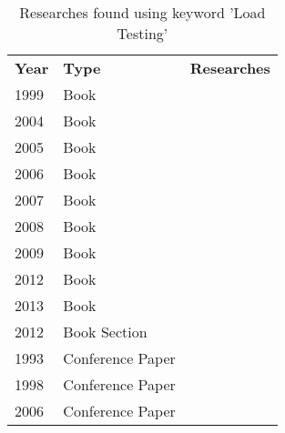 \begin{table}[]
\centering
\caption{Researches found using keyword 'Load Testing'}
\label{my-label}
\begin{tabular}{lll}
\rowcolor[HTML]{9B9B9B} 
\textbf{Year} & \textbf{Type}    & \textbf{Researches}                                                                 \\
1999          & Book             & \cite{Dustin1999}                                                                   \\
2004          & Book             & \cite{Perry2004}                                                                    \\
2005          & Book             & \cite{Lewis2005}                                                                    \\
2006          & Book             & \cite{Garousi2006}                                                                  \\
2007          & Book             & \cite{Corporation2007}                                                              \\
2008          & Book             & \cite{Halili2008}                                                                   \\
2009          & Book             & \cite{Molyneaux2009}                                                                \\
2012          & Book             & \cite{Kaczanowski2012}                                                              \\
2013          & Book             & \cite{Erinle2013}                                                                   \\
2012          & Book Section     & \cite{Avritzer2012a}                                                                \\
1993          & Conference Paper & \cite{Avritzer1993d}                                                                \\
1998          & Conference Paper & \cite{Alander}                                                                      \\
2006          & Conference Paper & \cite{Draheim2006b}\cite{Abu-nimeh2001}                                             \\

\end{tabular}
\end{table}
